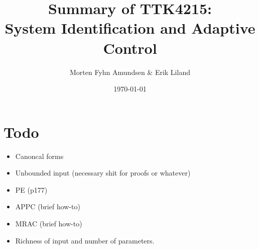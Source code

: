 \documentclass[a4paper,12pt]{article}
\title{Summary of TTK4215:\\System Identification and Adaptive Control}
\author{Morten Fyhn Amundsen \& Erik Liland}
\date{\today}
\begin{document}
\maketitle
\tableofcontents

\section{Todo}
\begin{itemize}
	\item Canoncal forms
	\item Unbounded input (necessary shit for proofs or whatever)
	\item PE (p177)
	\item APPC (brief how-to)
	\item MRAC (brief how-to)
	\item Richness of input and number of parameters.
\end{itemize}








\end{document}
